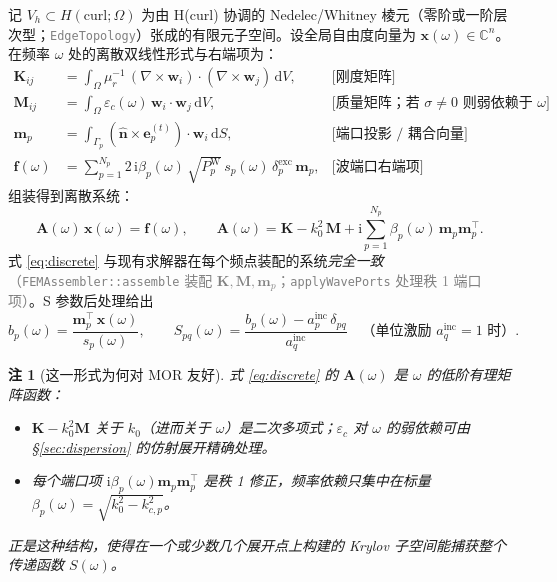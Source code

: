 \documentclass[11pt,a4paper]{ctexart}
\newcommand{\C}{\mathbb{C}}
\newcommand{\im}{\mathrm{i}}
\newtheorem{remark}{注}
\begin{document}
记 $V_h\subset H(\mathrm{curl};\Omega)$ 为由 H(curl) 协调的 Nedelec/Whitney 棱元（零阶或一阶层次型；\textcolor{gray}{\texttt{EdgeTopology}}）张成的有限元子空间。设全局自由度向量为 $\bm x(\omega)\in\C^{n}$。在频率 $\omega$ 处的离散双线性形式与右端项为：
\begin{align}
  \bm K_{ij} &= \int_\Omega \mu_r^{-1}\,(\nabla\times\bm w_i)\cdot
                 (\nabla\times\bm w_j)\,\mathrm dV,
  & \text{[刚度矩阵]}\\
  \bm M_{ij} &= \int_\Omega \varepsilon_c(\omega)\,\bm w_i\cdot\bm w_j\,\mathrm dV,
  & \text{[质量矩阵；若 $\sigma\!\neq\!0$ 则弱依赖于 $\omega$]}\\
  \bm m_p    &= \int_{\Gamma_p}(\hat{\bm n}\times\bm e_p^{(t)})\cdot\bm w_i\,\mathrm dS,
  & \text{[端口投影 / 耦合向量]}\\
  \bm f(\omega) &= \sum_{p=1}^{N_p} 2\,\im\beta_p(\omega)\,\sqrt{P_p^{\mathrm W}}\,s_p(\omega)\,\delta_p^{\mathrm{exc}}\,\bm m_p,
  & \text{[波端口右端项]}
\end{align}
组装得到离散系统：
\begin{equation}
  \boxed{\;
  \bm A(\omega)\,\bm x(\omega) = \bm f(\omega),\qquad
  \bm A(\omega) = \bm K - k_0^2\,\bm M
  + \im\sum_{p=1}^{N_p} \beta_p(\omega)\,\bm m_p \bm m_p^{\!\top}.
  \;}
  \label{eq:discrete}
\end{equation}
式 \eqref{eq:discrete} 与现有求解器在每个频点装配的系统\emph{完全一致}\textcolor{gray}{（\texttt{FEMAssembler::assemble} 装配 $\bm K,\bm M,\bm m_p$；\texttt{applyWavePorts} 处理秩 1 端口项）}。S 参数后处理给出
\begin{equation}
  b_p(\omega) = \frac{\bm m_p^{\!\top}\,\bm x(\omega)}{s_p(\omega)},
  \qquad
  S_{pq}(\omega) = \frac{b_p(\omega)-a_p^{\mathrm{inc}}\,\delta_{pq}}{a_q^{\mathrm{inc}}}
  \quad\text{（单位激励 $a_q^{\mathrm{inc}}=1$ 时）}.
  \label{eq:sparam}
\end{equation}

\begin{remark}[这一形式为何对 MOR 友好]
式 \eqref{eq:discrete} 的 $\bm A(\omega)$ 是 $\omega$ 的低阶\emph{有理矩阵函数}：
\begin{itemize}
  \item $\bm K - k_0^2\bm M$ 关于 $k_0$（进而关于 $\omega$）是二次多项式；$\varepsilon_c$ 对 $\omega$ 的弱依赖可由 \S\ref{sec:dispersion} 的仿射展开精确处理。
  \item 每个端口项 $\im\beta_p(\omega)\bm m_p\bm m_p^{\!\top}$ 是秩 1 修正，频率依赖只集中在标量 $\beta_p(\omega)=\sqrt{k_0^2-k_{c,p}^2}$。
\end{itemize}
正是这种结构，使得在一个或少数几个展开点上构建的 Krylov 子空间能捕获整个传递函数 $S(\omega)$。
\end{remark}
\end{document}
